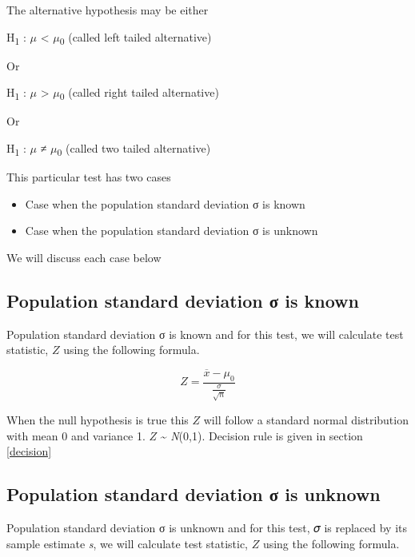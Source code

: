 \documentclass[
]{book}
\begin{document}
The alternative hypothesis may be either

H\textsubscript{1} : \(μ\) \textless{} \(μ\)\textsubscript{0} (called left tailed alternative)

Or

H\textsubscript{1} : \(μ\) \textgreater{} \(μ\)\textsubscript{0} (called right tailed alternative)

Or

H\textsubscript{1} : \(μ\) ≠ \(μ\)\textsubscript{0} (called two tailed alternative)

This particular test has two cases

\begin{itemize}
\item
  Case when the population standard deviation σ is known
\item
  Case when the population standard deviation σ is unknown
\end{itemize}

We will discuss each case below

\hypertarget{population-standard-deviation-ux3c3-is-known}{%
\subsection*{Population standard deviation σ is known}\label{population-standard-deviation-ux3c3-is-known}}

Population standard deviation σ is known and for this test, we will
calculate test statistic, \(Z\) using the following formula.

\[Z = \frac{\overline{x} - \mu_{0}}{\frac{\sigma}{\sqrt{n}}}\]

When the null hypothesis is true this \(Z\) will follow a standard normal distribution with mean 0 and variance 1. \(Z\) \textasciitilde{} \emph{N}(0,1). Decision rule is given in section \ref{decision}

\hypertarget{population-standard-deviation-ux3c3-is-unknown}{%
\subsection*{Population standard deviation σ is unknown}\label{population-standard-deviation-ux3c3-is-unknown}}

Population standard deviation σ is unknown and for this test, 𝜎 is replaced by its sample estimate \emph{s}, we will calculate test statistic, \(Z\) using the following formula.
\end{document}
